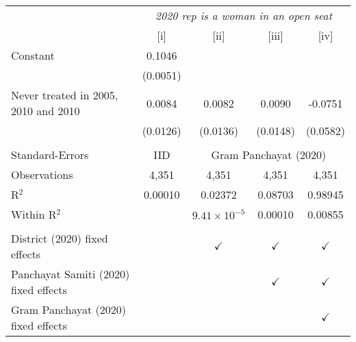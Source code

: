 
\begingroup
\centering
\begin{tabular}{lcccc}
   \toprule
    & \multicolumn{4}{c}{\textit{2020 rep is a woman in an open seat}}\\
                                         & [i]      & [ii]                  & [iii]         & [iv]\\  
   \midrule 
   Constant                              & 0.1046   &                       &               &   \\   
                                         & (0.0051) &                       &               &   \\   
   Never treated in 2005, 2010 and 2010  & 0.0084   & 0.0082                & 0.0090        & -0.0751\\   
                                         & (0.0126) & (0.0136)              & (0.0148)      & (0.0582)\\   
    \\
   Standard-Errors & IID & \multicolumn{3}{c}{Gram Panchayat (2020)} \\ 
   Observations                          & 4,351    & 4,351                 & 4,351         & 4,351\\  
   R$^2$                                 & 0.00010  & 0.02372               & 0.08703       & 0.98945\\  
   Within R$^2$                          &          & $9.41\times 10^{-5}$  & 0.00010       & 0.00855\\  
    \\
   District (2020) fixed effects         &          & $\checkmark$          & $\checkmark$  & $\checkmark$\\   
   Panchayat Samiti (2020) fixed effects &          &                       & $\checkmark$  & $\checkmark$\\   
   Gram Panchayat (2020) fixed effects   &          &                       &               & $\checkmark$\\   
   \bottomrule
\end{tabular}
\par\endgroup


